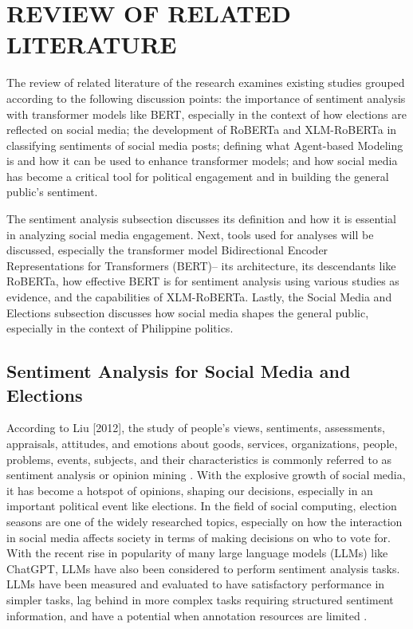 \chapter{REVIEW OF RELATED LITERATURE}
The review of related literature of the research examines existing studies grouped according to the following discussion points: the importance of sentiment analysis with transformer models like BERT, especially in the context of how elections are reflected on social media; the development of RoBERTa and XLM-RoBERTa in classifying sentiments of social media posts; defining what Agent-based Modeling is and how it can be used to enhance transformer models; and how social media has become a critical tool for political engagement and in building the general public’s sentiment.

The sentiment analysis subsection discusses its definition and how it is essential in analyzing social media engagement. Next, tools used for analyses will be discussed, especially the transformer model Bidirectional Encoder Representations for Transformers (BERT)-- its architecture, its descendants like RoBERTa, how effective BERT is for sentiment analysis using various studies as evidence, and the capabilities of XLM-RoBERTa. Lastly, the Social Media and Elections subsection discusses how social media shapes the general public, especially in the context of Philippine politics. 

\section{Sentiment Analysis for Social Media and Elections}
According to Liu [2012], the study of people's views, sentiments, assessments, appraisals, attitudes, and emotions about goods, services, organizations, people, problems, events, subjects, and their characteristics is commonly referred to as sentiment analysis or opinion mining \cite{Liu-2012}. With the explosive growth of social media, it has become a hotspot of opinions, shaping our decisions, especially in an important political event like elections. In the field of social computing, election seasons are one of the widely researched topics, especially on how the interaction in social media affects society in terms of making decisions on who to vote for. With the recent rise in popularity of many large language models (LLMs) like ChatGPT, LLMs have also been considered to perform sentiment analysis tasks. LLMs have been measured and evaluated to have satisfactory performance in simpler tasks, lag behind in more complex tasks requiring structured sentiment information, and have a potential when annotation resources are limited \cite{Liu-2023}.

